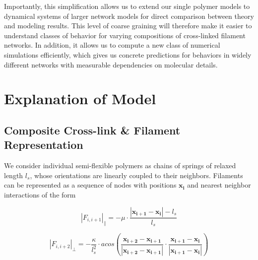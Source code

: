 \documentclass[pre,preprint]{revtex4-1}
\begin{document}
Importantly, this simplification allows us to extend our single polymer models to dynamical systems of larger network models for direct comparison between theory and modeling results.  This level of coarse graining will therefore make it easier to understand classes of behavior for varying compositions of cross-linked filament networks.  In addition, it allows us to compute a new class of numerical simulations efficiently, which gives us concrete predictions for behaviors in widely different networks with measurable dependencies on molecular details.



































\section{Explanation of Model}

\subsection{Composite Cross-link \& Filament Representation}
We consider individual semi-flexible polymers as chains of springs of relaxed length $l_s$, whose orientations are linearly coupled to their neighbors. Filaments can be represented as a sequence of nodes with positions $\mathbf{x_i}$ and nearest neighbor interactions of the form

\begin{equation}
|F_{i,i+1}|_{\parallel} = -\mu\cdot\frac{|\mathbf{x_{i+1}}-\mathbf{x_i}|-l_s}{l_s} 
\end{equation}

\begin{equation}
|F_{i,i+2}|_{\perp} = -\frac{\kappa}{l_s^2}\cdot acos\left (\frac{\mathbf{x_{i+2}}-\mathbf{x_{i+1}}}{|\mathbf{x_{i+2}}-\mathbf{x_{i+1}}|} \cdot\frac{\mathbf{x_{i+1}}-\mathbf{x_i}}{|\mathbf{x_{i+1}}-\mathbf{x_i}|} \right ) 
\end{equation}
\end{document}
